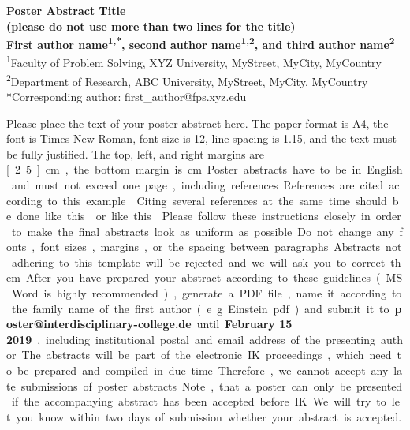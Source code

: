\documentclass[a4paper,fontsize=12pt]{scrartcl}
\begin{document}
\pagestyle{empty}
\begin{spacing}{1.11}
\begin{center}
  \changefontsizes{20pt}\textbf{Poster Abstract Title \\
  (please do not use more than two lines for the title)} \\
  \vspace{.74cm}
  \changefontsizes{12pt}\textbf{First author name\textsuperscript{1,*}, second author name\textsuperscript{1,2}, and third author name\textsuperscript{2}} \\
  \vspace{.44cm}
  \changefontsizes{10pt}\textsuperscript{1}Faculty of Problem Solving, XYZ University, MyStreet, MyCity, MyCountry \\
  \textsuperscript{2}Department of Research, ABC University, MyStreet, MyCity, MyCountry \\{}
  *Corresponding author: first\_author@fps.xyz.edu
\end{center}
\vspace{-.08cm}

Please place the text of your poster abstract here.
The paper format is A4, the font is Times New Roman, font size is 12, line spacing is 1.15, and the text must be fully justified.
The top, left, and right margins are \unit[2.5]{cm}, the bottom margin is \unit[3]{cm}.
Poster abstracts have to be in English and must not exceed one page, including references.
References are cited according to this example~\cite{katja2013}.
Citing several references at the same time should be done like this~\cite{katja2013,till2012} or like this~\cite{katja2013,till2012,katja2011,smeddinck2015}.
Please follow these instructions closely in order to make the final abstracts look as uniform as possible.
Do not change any fonts, font sizes, margins, or the spacing between paragraphs.
Abstracts not adhering to this template will be rejected and we will ask you to correct them.

After you have prepared your abstract according to these guidelines (MS Word is highly recommended), generate a PDF file, name it according to the family name of the first author (e.g. Einstein.pdf) and submit it to \textbf{poster@interdisciplinary-college.de} until \textbf{February 15 2019}, including institutional postal and email address of the presenting author.
The abstracts will be part of the electronic IK proceedings, which need to be prepared and compiled in due time.
Therefore, we cannot accept any late submissions of poster abstracts.
Note, that a poster can only be presented if the accompanying abstract has been accepted before IK.
We will try to let you know within two days of submission whether your abstract is accepted.

\end{spacing}
\vspace{-.35cm}
\printbibliography
\end{document}
